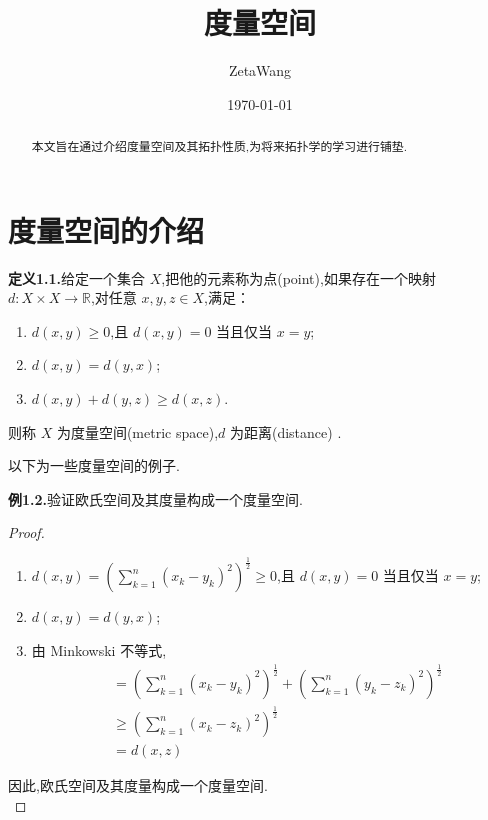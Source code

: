 \documentclass{article}
\title{度量空间}
\author{ZetaWang}
\date{\today}
\begin{document}
\maketitle

\begin{abstract}
本文旨在通过介绍度量空间及其拓扑性质,为将来拓扑学的学习进行铺垫.
\end{abstract}

\tableofcontents %
\newpage

\section{度量空间的介绍}
\textbf{定义1.1.}给定一个集合 $X$,把他的元素称为点(point),如果存在一个映射 $d:X\times X\rightarrow \mathbb{R}$,对任意 $x,y,z\in X$,满足：
\begin{enumerate}[label={\textbullet}]
    \item $d(x,y)\geq 0$,且 $d(x,y) = 0$ 当且仅当 $x=y$;
    \item $d(x,y) = d(y,x)$;
    \item $d(x,y) + d(y,z) \geq d(x,z)$.
\end{enumerate}
则称 $X$ 为度量空间(metric space),$d$ 为距离(distance) .\setlength{\parskip}{1em} %

以下为一些度量空间的例子.\setlength{\parskip}{1em} %

\textbf{例1.2.}验证欧氏空间及其度量构成一个度量空间.
\begin{proof}
    \leavevmode
    \begin{enumerate}[label={\textbullet}]
        \item $d(x,y) = (\sum\limits_{k=1}^{n}( x_k-y_k)^2)^{\frac{1}{2}} \geq 0$,且 $d(x,y) = 0$ 当且仅当 $x=y$;
        \item $d(x,y) = d(y,x)$;
        \item 由 Minkowski 不等式,
        \begin{align*}
            & = (\sum_{k=1}^{n}( x_k-y_k)^2)^\frac{1}{2} + (\sum_{k=1}^{n}( y_k-z_k)^2)^{\frac{1}{2}} \\
            & \geq (\sum_{k=1}^{n}( x_k-z_k)^2)^{\frac{1}{2}} \\
            & = d(x,z)
        \end{align*}
    \end{enumerate}
    因此,欧氏空间及其度量构成一个度量空间.\\
\end{proof}
\end{document}

